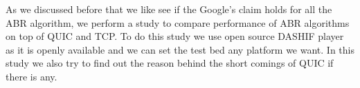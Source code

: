 
As we discussed before that we like see if the Google's claim holds for all the ABR algorithm, we perform a study to compare performance of ABR algorithms on top of QUIC and TCP. To do this study we use open source DASHIF player as it is openly available and we can set the test bed any platform we want. In this study we also try to find out the reason behind the short comings of QUIC if there is any.

